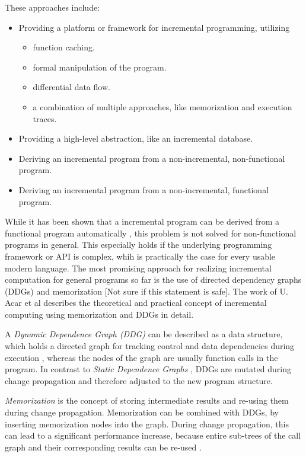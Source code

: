 These approaches include: 
\begin{itemize}
\item Providing a platform or framework for incremental programming, utilizing
\begin{itemize}
\item function caching. \cite{heydon2000caching} \cite{Pugh1989} 
\item formal manipulation of the program. \cite{cohen1991dynamic}
\item differential data flow. \cite{naiadIncremental}
\item a combination of multiple approaches, like memorization and execution traces.  \cite{Hammer2009} \cite{Chen2014} \cite{Acar2008} \cite{acar2006adaptive}   
\end{itemize}
\item Providing a high-level abstraction, like an incremental database. \cite{Peng2010}
\item Deriving an incremental program from a non-incremental, non-functional program. \cite{liu1995systematic} 
\item Deriving an incremental program from a non-incremental, functional program. \cite{ley2008compiling} 
\end{itemize}

While it has been shown that a incremental program can be derived from a functional program automatically \cite{ley2008compiling}, this problem is not solved for non-functional programs in general. This especially holds if the underlying programming framework or API is complex, whih is practically the case for every usable modern language. The most promising approach for realizing incremental computation for general programs so far is the use of directed dependency graphs (DDGs) and memorization \cite{Acar2005thesis} \cite{??} [Not sure if this statement is safe]. The work of U. Acar et al\cite{Acar2005thesis} describes the theoretical and practical concept of incremental computing using memorization and DDGs in detail.

A \textit{Dynamic Dependence Graph (DDG)} can be described as a data structure, which holds a directed graph for tracking control and data dependencies during execution \cite{Acar2005thesis}, whereas the nodes of the graph are usually function calls in the program. In contrast to \textit{Static Dependence Graphs} \cite{Demers1981}, DDGs are mutated during change propagation and therefore adjusted to the new program structure. 

\textit{Memorization} is the concept of storing intermediate results and re-using them during change propagation. Memorization can be combined with DDGs, by inserting memorization nodes into the graph. During change propagation, this can lead to a significant performance increase, because entire sub-trees of the call graph and their corresponding results can be re-used \cite{Acar2005thesis}.

